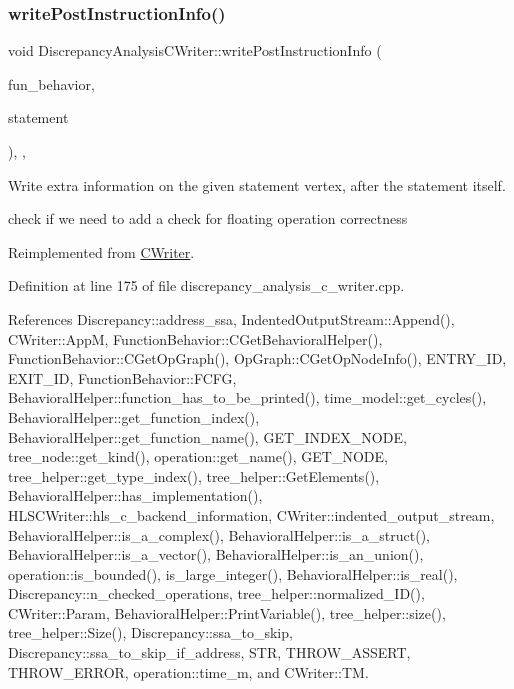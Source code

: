 \subsubsection{\texorpdfstring{write\+Post\+Instruction\+Info()}{writePostInstructionInfo()}}
{\footnotesize\ttfamily void Discrepancy\+Analysis\+C\+Writer\+::write\+Post\+Instruction\+Info (\begin{DoxyParamCaption}\item[{const \hyperlink{function__behavior_8hpp_a94872da12ed056b6ecf90456164e0213}{Function\+Behavior\+Const\+Ref}}]{fun\+\_\+behavior,  }\item[{const \hyperlink{graph_8hpp_abefdcf0544e601805af44eca032cca14}{vertex}}]{statement }\end{DoxyParamCaption})\hspace{0.3cm}{\ttfamily [override]}, {\ttfamily [protected]}, {\ttfamily [virtual]}}



Write extra information on the given statement vertex, after the statement itself. 

check if we need to add a check for floating operation correctness 

Reimplemented from \hyperlink{classCWriter_ad32d1e42246eafd2825029065ccd6280}{C\+Writer}.



Definition at line 175 of file discrepancy\+\_\+analysis\+\_\+c\+\_\+writer.\+cpp.



References Discrepancy\+::address\+\_\+ssa, Indented\+Output\+Stream\+::\+Append(), C\+Writer\+::\+AppM, Function\+Behavior\+::\+C\+Get\+Behavioral\+Helper(), Function\+Behavior\+::\+C\+Get\+Op\+Graph(), Op\+Graph\+::\+C\+Get\+Op\+Node\+Info(), E\+N\+T\+R\+Y\+\_\+\+ID, E\+X\+I\+T\+\_\+\+ID, Function\+Behavior\+::\+F\+C\+FG, Behavioral\+Helper\+::function\+\_\+has\+\_\+to\+\_\+be\+\_\+printed(), time\+\_\+model\+::get\+\_\+cycles(), Behavioral\+Helper\+::get\+\_\+function\+\_\+index(), Behavioral\+Helper\+::get\+\_\+function\+\_\+name(), G\+E\+T\+\_\+\+I\+N\+D\+E\+X\+\_\+\+N\+O\+DE, tree\+\_\+node\+::get\+\_\+kind(), operation\+::get\+\_\+name(), G\+E\+T\+\_\+\+N\+O\+DE, tree\+\_\+helper\+::get\+\_\+type\+\_\+index(), tree\+\_\+helper\+::\+Get\+Elements(), Behavioral\+Helper\+::has\+\_\+implementation(), H\+L\+S\+C\+Writer\+::hls\+\_\+c\+\_\+backend\+\_\+information, C\+Writer\+::indented\+\_\+output\+\_\+stream, Behavioral\+Helper\+::is\+\_\+a\+\_\+complex(), Behavioral\+Helper\+::is\+\_\+a\+\_\+struct(), Behavioral\+Helper\+::is\+\_\+a\+\_\+vector(), Behavioral\+Helper\+::is\+\_\+an\+\_\+union(), operation\+::is\+\_\+bounded(), is\+\_\+large\+\_\+integer(), Behavioral\+Helper\+::is\+\_\+real(), Discrepancy\+::n\+\_\+checked\+\_\+operations, tree\+\_\+helper\+::normalized\+\_\+\+I\+D(), C\+Writer\+::\+Param, Behavioral\+Helper\+::\+Print\+Variable(), tree\+\_\+helper\+::size(), tree\+\_\+helper\+::\+Size(), Discrepancy\+::ssa\+\_\+to\+\_\+skip, Discrepancy\+::ssa\+\_\+to\+\_\+skip\+\_\+if\+\_\+address, S\+TR, T\+H\+R\+O\+W\+\_\+\+A\+S\+S\+E\+RT, T\+H\+R\+O\+W\+\_\+\+E\+R\+R\+OR, operation\+::time\+\_\+m, and C\+Writer\+::\+TM.

